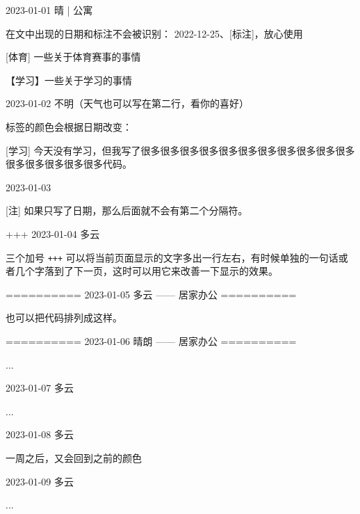 \documentclass[11pt, paperstyle=light yellow, color entry]{jwjournal}
\begin{document}
2023-01-01 晴 | 公寓

  在文中出现的日期和标注不会被识别： 2022-12-25、[标注]，放心使用

  [体育] 一些关于体育赛事的事情

  【学习】一些关于学习的事情 %



2023-01-02
不明（天气也可以写在第二行，看你的喜好）

  标签的颜色会根据日期改变：

  [学习] 今天没有学习，但我写了很多很多很多很多很多很多很多很多很多很多很多很多很多很多很多很多代码。



2023-01-03

  [注] 如果只写了日期，那么后面就不会有第二个分隔符。


+++
2023-01-04  多云

  三个加号 \texttt{+++} 可以将当前页面显示的文字多出一行左右，有时候单独的一句话或者几个字落到了下一页，这时可以用它来改善一下显示的效果。



==========
2023-01-05    多云        —— 居家办公
==========

也可以把代码排列成这样。


==========
2023-01-06    晴朗        —— 居家办公
==========

...



2023-01-07  多云

  ...



2023-01-08  多云

  一周之后，又会回到之前的颜色



2023-01-09  多云

  ...
\end{document}
